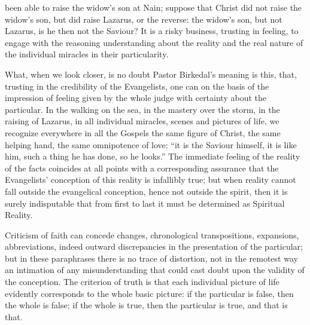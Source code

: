 \documentclass[12pt,a4paper,openany]{book}
\newcommand{\opage}[1]{\marginnote{\footnotesize\textit{[#1]}}}
\begin{document}
been able to raise the widow's son at Nain; suppose that Christ
\setcounter{footnote}{0}%
\opage{25}did not raise the widow's son, but did raise Lazarus, or
the reverse: the widow's son, but not Lazarus, is he then not
the Saviour? It is a risky business, trusting in feeling,
to engage with the reasoning understanding about
the reality and the real nature of the individual
miracles in their particularity.

What, when we look closer, is no doubt Pastor
Birkedal's meaning is this, that, trusting in the credibility
of the Evangelists, one can on the basis of the impression of feeling given by the
whole judge with certainty about the particular. In the walking
on the sea, in the mastery over the storm, in the raising
of Lazarus, in all individual miracles, scenes and pictures of life,
we recognize everywhere in all the Gospels the same
figure of Christ, the same helping hand, the
same omnipotence of love: ``it is the Saviour himself, it
is like him, such a thing he has done, so he looks.''
The immediate feeling of the reality of the facts
coincides at all points with a corresponding
assurance that the Evangelists' conception of this
reality is infallibly true; but when reality
cannot fall outside the evangelical conception, hence
not outside the spirit, then it is surely indisputable
that from first to last it must be determined as Spiritual Reality.

Criticism of faith can concede changes, chronological
transpositions, expansions, abbreviations, indeed outward discrepancies
in the presentation of the particular; but in these
\setcounter{footnote}{0}%
\opage{26}paraphrases there is no trace of distortion, not in the remotest way an intimation of any misunderstanding
that could cast doubt upon the validity of the conception.
The criterion of truth is that each individual picture of life evidently
corresponds to the whole basic picture: if the particular is false,
then the whole is false; if the whole is true, then the particular is
true, and that is that.
\end{document}
